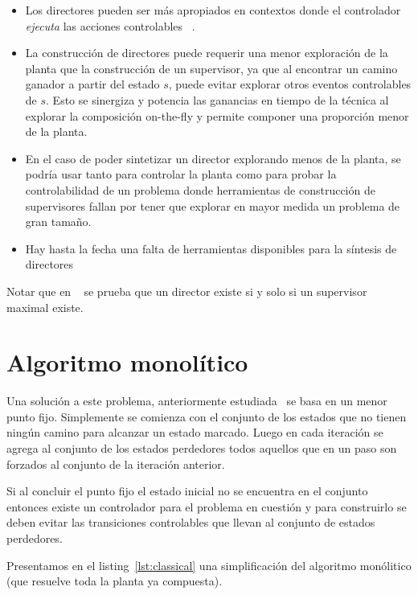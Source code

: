 \begin{itemize}
	\item Los directores pueden ser más apropiados en contextos donde el controlador \textit{ejecuta} las acciones controlables ~\cite{Huang:2008:DCD}.
	
	\item La construcción de directores puede requerir una menor exploración de la planta que la construcción de un supervisor, ya que al encontrar un camino ganador a partir del estado $s$, puede evitar explorar otros eventos controlables de $s$. Esto se sinergiza y potencia las ganancias en tiempo de la técnica al explorar la composición on-the-fly y permite componer una proporción menor de la planta.
	
	\item En el caso de poder sintetizar un director explorando menos de la planta, se podría usar tanto para controlar la planta como para probar la controlabilidad de un problema donde herramientas de construcción de supervisores fallan por tener que explorar en mayor medida un problema de gran tamaño.
	
	\item Hay hasta la fecha una falta de herramientas disponibles para la síntesis de directores
\end{itemize}

Notar que en ~\cite{Huang:2008:DCD} se prueba que un director existe si y solo si un supervisor maximal existe.

\section{Algoritmo monolítico} \label{chpt:algoMono}

Una solución a este problema, anteriormente estudiada~\cite{Ehlers:EECS-2013-162} se basa en un menor punto fijo. Simplemente se comienza con el conjunto de los estados que no tienen ningún camino para alcanzar un estado marcado. Luego en cada iteración se agrega al conjunto de los estados perdedores todos aquellos que en un paso son forzados al conjunto de la iteración anterior. 

Si al concluir el punto fijo el estado inicial no se encuentra en el conjunto entonces existe un controlador para el problema en cuestión y para construirlo se deben evitar las transiciones controlables que llevan al conjunto de estados perdedores.

Presentamos en el listing~\ref{lst:classical} una simplificación del algoritmo monólitico (que resuelve toda la planta ya compuesta).


